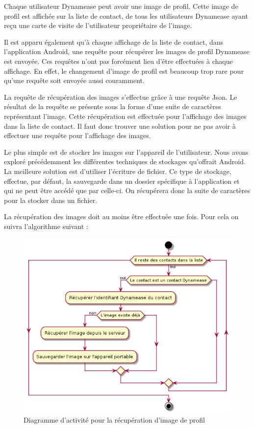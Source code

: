 Chaque utilisateur Dynamease peut avoir une image de profil. Cette image de profil est affichée sur la liste de contact, de tous les utilisateurs Dynamease ayant reçu une carte de visite de l'utilisateur propriétaire de l'image.

Il est apparu également qu'à chaque affichage de la liste de contact, dans l'application Android, une requête pour récupérer les images de profil Dynamease est envoyée. Ces requêtes n'ont pas forcément lieu d'être effectuées à chaque affichage. En effet, le changement d'image de profil est beaucoup trop rare pour qu'une requête soit envoyée aussi couramment.

La requête de récupération des images s'effectue grâce à une requête Json. Le résultat de la requête se présente sous la forme d'une suite de caractères représentant l'image. Cette récupération est effectuée pour l'affichage des images dans la liste de contact. Il faut donc trouver une solution pour ne pas avoir à effectuer une requête pour l'affichage des images.

Le plus simple est de stocker les images sur l'appareil de l'utilisateur. Nous avons exploré précédemment les différentes techniques de stockages qu'offrait Android. La meilleure solution est d'utiliser l'écriture de fichier. Ce type de stockage, effectue, par défaut, la sauvegarde dans un dossier spécifique à l'application et qui ne peut être accédé que par celle-ci. On récupérera donc la suite de caractères pour la stocker dans un fichier.

La récupération des images doit au moins être effectuée une fois. Pour cela on suivra l'algorithme suivant :

\begin{figure}[!h]
	\centering
	\includegraphics[scale=0.5]{img/activity_image.png}
	\caption{\label{activity_image} {Diagramme d'activité pour la récupération d'image de profil}}
\end{figure}

